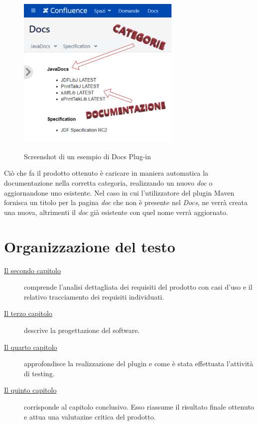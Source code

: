 \begin{figure}[H]
    \centering
    \includegraphics[width=0.7\textwidth]{immagini/docs-conf.png}\\
    \caption{Screenshot di un esempio di Docs Plug-in}
\end{figure}

Ciò che fa il prodotto ottenuto è caricare in maniera automatica la documentazione nella corretta categoria, realizzando un nuovo \emph{doc} o aggiornandone uno esistente.
Nel caso in cui l'utilizzatore del plugin Maven fornisca un titolo per la pagina \emph{doc} che non è presente nel \emph{Docs}, ne verrà creata una nuova, altrimenti il \emph{doc} già esistente con quel nome verrà aggiornato.

\section{Organizzazione del testo}

\begin{description}
    \item[{\hyperref[cap:analisi-requisiti]{Il secondo capitolo}}] comprende l'analisi dettagliata dei requisiti del prodotto con casi d'uso e il relativo tracciamento dei requisiti individuati.

    \item[{\hyperref[cap:progettazione]{Il terzo capitolo}}] descrive la progettazione del software.

    \item[{\hyperref[cap:realizzazione-testing]{Il quarto capitolo}}] approfondisce la realizzazione del plugin e come è stata effettuata l'attività di testing.

    \item[{\hyperref[cap:conclusioni]{Il quinto capitolo}}] corrisponde al capitolo conclusivo. Esso riassume il risultato finale ottenuto e attua una valutazine critica del prodotto.

\end{description}

